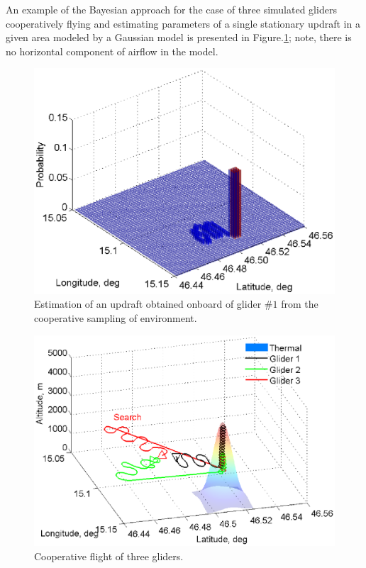 \documentclass[letterpaper, 10 pt, conference]{ieeeconf}  %
\begin{document}
An example of the Bayesian approach for the case of three simulated gliders cooperatively flying and estimating parameters of a single stationary updraft in a given area modeled by a Gaussian model is presented in Figure.\ref{fig:SimPDF}; note, there is no horizontal component of airflow in the model.
\begin{figure}[thpb]
  \centering
  \includegraphics[scale=0.51]{Figures/Mapping_thermals.eps}
  \caption{Estimation of an updraft obtained onboard of glider $\#1$ from
  the cooperative sampling of environment.}
  \label{fig:SimPDF}
\end{figure}
\begin{figure}[thpb]
  \centering
  \includegraphics[scale=0.41]{Figures/paths_cooperative_flight.eps}
  \caption{Cooperative flight of three gliders.}
  \label{fig:CoopFlightPaths}
\end{figure}
\end{document}
